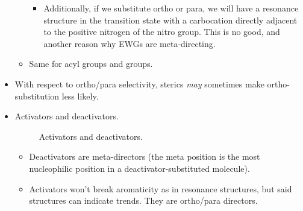 \documentclass[../notes.tex]{subfiles}
\begin{document}
\begin{itemize}
\begin{itemize}
\begin{itemize}
            \item Additionally, if we substitute ortho or para, we will have a resonance structure in the transition state with a carbocation directly adjacent to the positive nitrogen of the nitro group. This is no good, and another reason why EWGs are meta-directing.
        \end{itemize}
        \item Same for acyl groups and  groups.
    \end{itemize}
    \item With respect to ortho/para selectivity, sterics \emph{may} sometimes make ortho-substitution less likely.
    \item Activators and deactivators.
    \begin{figure}[h!]
        \centering
        \footnotesize
        \caption{Activators and deactivators.}
        \label{fig:DeActivators}
    \end{figure}
    \begin{itemize}
        \item Deactivators are meta-directors (the meta position is the most nucleophilic position in a deactivator-substituted molecule).
        \item Activators won't break aromaticity as in resonance structures, but said structures can indicate trends. They are ortho/para directors.

\end{itemize}
\end{itemize}
\end{document}
